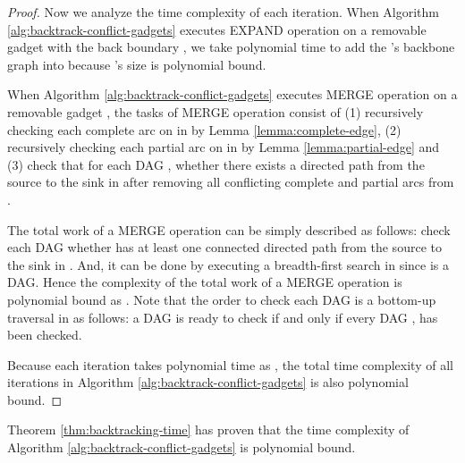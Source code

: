 \documentclass[11pt]{article}
\begin{document}
\begin{proof}
Now we analyze the time complexity of each iteration.
When Algorithm \ref{alg:backtrack-conflict-gadgets} executes EXPAND operation on a removable gadget  with the back boundary ,
we take polynomial time to add the 's backbone graph  into 
because 's size is polynomial bound.

When Algorithm \ref{alg:backtrack-conflict-gadgets} executes MERGE operation on a removable gadget ,
the tasks of MERGE operation consist of
(1) recursively checking each complete arc on  in 
by Lemma \ref{lemma:complete-edge},
(2) recursively checking each partial arc on  in  by Lemma \ref{lemma:partial-edge} and
(3) check that for each DAG ,
whether there exists a directed path
from the source to the sink in 
after removing all conflicting complete and partial arcs from .

The total work of a MERGE operation can be simply described as follows:
check each DAG  whether  has at least one connected
directed path from the source to the sink in .
And, it can be done by executing a breadth-first search in 
since  is a DAG. Hence the complexity of the total work of a MERGE operation
is polynomial bound as .
Note that the order to check each DAG 
is a bottom-up traversal in  as follows:
a DAG  is ready to check if and only if
every DAG , has been checked.



Because each iteration takes polynomial time as ,
the total time complexity of all  iterations in Algorithm \ref{alg:backtrack-conflict-gadgets}
is also polynomial bound.

\end{proof}

Theorem \ref{thm:backtracking-time} has proven that
the time complexity of Algorithm \ref{alg:backtrack-conflict-gadgets}
is polynomial bound.
\clearpage
\end{document}
